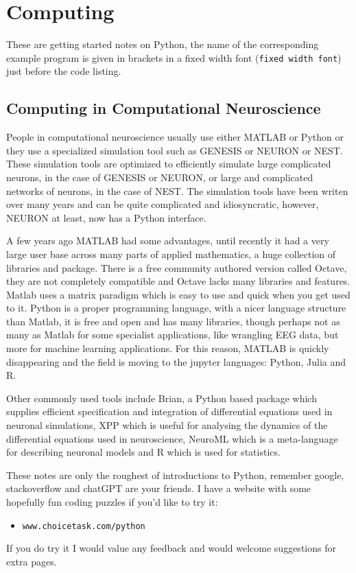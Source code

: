 \documentclass[12pt]{article}
\begin{document}
\section*{Computing}
These are getting started notes on Python, the name of the
corresponding example program is given in brackets in a fixed width
font (\texttt{fixed width font}) just before the code listing.
\subsection*{Computing in Computational Neuroscience}
People in computational neuroscience usually use either MATLAB or
Python or they use a specialized simulation tool such as GENESIS or
NEURON or NEST. These simulation tools are optimized to efficiently
simulate large complicated neurons, in the case of GENESIS or NEURON,
or large and complicated networks of neurons, in the case of NEST. The
simulation tools have been writen over many years and can be quite
complicated and idiosyncratic, however, NEURON at least, now has a
Python interface. 

A few years ago MATLAB had some advantages, until recently it had a
very large user base across many parts of applied mathematics, a huge
collection of libraries and package. There is a free community
authored version called Octave, they are not completely compatible and
Octave lacks many libraries and features. Matlab uses a matrix
paradigm which is easy to use and quick when you get used to
it. Python is a proper programming language, with a nicer language
structure than Matlab, it is free and open and has many libraries,
though perhaps not as many as Matlab for some specialist applications,
like wrangling EEG data, but more for machine learning
applications. For this reason, MATLAB is quickly disappearing and the
field is moving to the jupyter languages: Python, Julia and R.

Other commonly used tools include Brian, a Python based package which
supplies efficient specification and integration of differential
equations used in neuronal simulations, XPP which is useful for
analysing the dynamics of the differential equations used in
neuroscience, NeuroML which is a meta-language for describing neuronal
models and R which is used for statistics.

These notes are only the roughest of introductions to Python, remember
google, stackoverflow and chatGPT are your friends. I have a website with some hopefully fun coding puzzles if you'd like to try it:
\begin{itemize}
\item \texttt{www.choicetask.com/python}
\end{itemize}
If you do try it I would value any feedback and would welcome
suggestions for extra pages.
\end{document}
